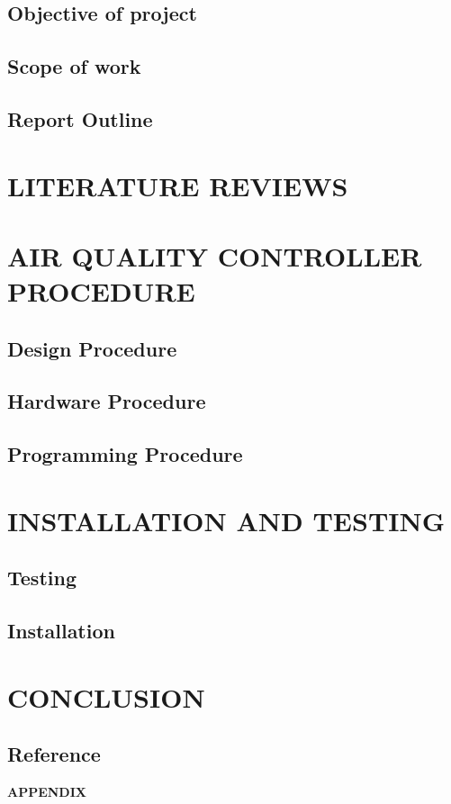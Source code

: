 \documentclass[a4paper,11pt]{report}
\begin{document}
	\section{Objective of project}
        \section{Scope of work}
        \section{Report Outline}
	\chapter{LITERATURE REVIEWS}
	\chapter{AIR QUALITY CONTROLLER PROCEDURE}
	\section{Design Procedure}
	\section{Hardware Procedure}
	\section{Programming Procedure}
	\chapter{INSTALLATION AND TESTING}
	\section{Testing}
	\section{Installation}
	\chapter{CONCLUSION}
	\newpage
	\section*{Reference}
	\newpage
	\begin{center}
	{\Large    \textbf{APPENDIX}}
	\end{center}
	
\end{document}

